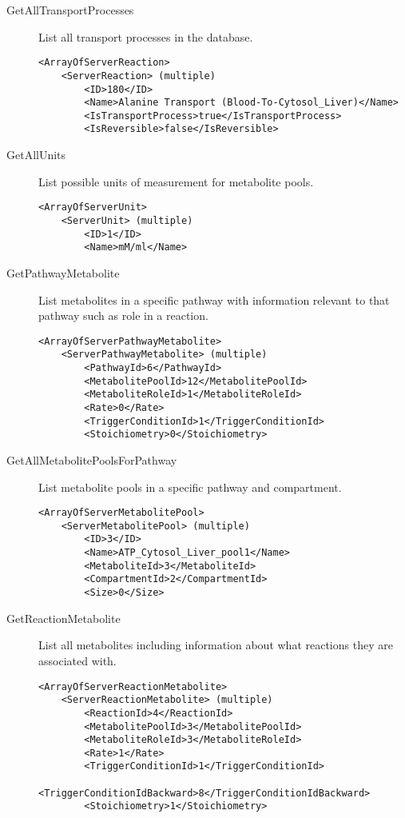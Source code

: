 \begin{description}
    \item[GetAllTransportProcesses] List all transport processes in the
    database.

    \begin{lstlisting}
<ArrayOfServerReaction>
    <ServerReaction> (multiple)
        <ID>180</ID>
        <Name>Alanine Transport (Blood-To-Cytosol_Liver)</Name>
        <IsTransportProcess>true</IsTransportProcess>
        <IsReversible>false</IsReversible>
    \end{lstlisting}

    \item[GetAllUnits] List possible units of measurement for metabolite pools.

    \begin{lstlisting}
<ArrayOfServerUnit>
    <ServerUnit> (multiple)
        <ID>1</ID>
        <Name>mM/ml</Name>
    \end{lstlisting}

    \item[GetPathwayMetabolite] List metabolites in a specific pathway with
    information relevant to that pathway such as role in a reaction.

    \begin{lstlisting}
<ArrayOfServerPathwayMetabolite>
    <ServerPathwayMetabolite> (multiple)
        <PathwayId>6</PathwayId>
        <MetabolitePoolId>12</MetabolitePoolId>
        <MetaboliteRoleId>1</MetaboliteRoleId>
        <Rate>0</Rate>
        <TriggerConditionId>1</TriggerConditionId>
        <Stoichiometry>0</Stoichiometry>
    \end{lstlisting}

    \item[GetAllMetabolitePoolsForPathway] List metabolite pools in a specific
    pathway and compartment.

    \begin{lstlisting}
<ArrayOfServerMetabolitePool>
    <ServerMetabolitePool> (multiple)
        <ID>3</ID>
        <Name>ATP_Cytosol_Liver_pool1</Name>
        <MetaboliteId>3</MetaboliteId>
        <CompartmentId>2</CompartmentId>
        <Size>0</Size>
    \end{lstlisting}

    \item[GetReactionMetabolite] List all metabolites including information
    about what reactions they are associated with.

    \begin{lstlisting}
<ArrayOfServerReactionMetabolite>
    <ServerReactionMetabolite> (multiple)
        <ReactionId>4</ReactionId>
        <MetabolitePoolId>3</MetabolitePoolId>
        <MetaboliteRoleId>3</MetaboliteRoleId>
        <Rate>1</Rate>
        <TriggerConditionId>1</TriggerConditionId>
        <TriggerConditionIdBackward>8</TriggerConditionIdBackward>
        <Stoichiometry>1</Stoichiometry>
    \end{lstlisting}


\end{description}
